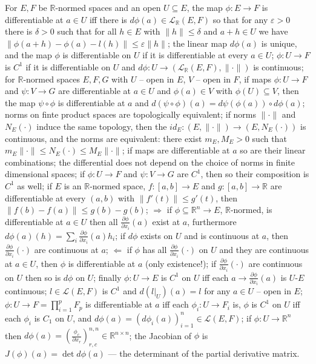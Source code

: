 \documentclass[a4paper]{article}
\newcommand{\Lcal}{\mathcal{L}}
\newcommand{\real}{\mathbb{R}}
\begin{document}
For $E, F$ be $\real$-normed spaces and an open $U\subseteq E$, the map $\phi\colon E\to F$
is differentiable at $a\in U$ iff there is $d\phi(a) \in \Lcal_\real(E, F)$ so that for any
$\varepsilon > 0$ there is $\delta > 0$ such that for all $h\in E$ with $\|h\| \leq \delta$
and $a + h \in U$ we have $\|\phi(a+h) - \phi(a) - l(h) \| \leq \varepsilon \|h\|$;
%
the linear map $d\phi(a)$ is unique, and the map $\phi$ is differentiable on $U$ if
it is differentiable at every $a\in U$;
%
$\phi\colon U \to F$ is $C^1$ if it is differentiable on $U$ and
$d\phi\colon U \to (\Lcal_\real(E, F), \|\cdot\|)$ is continuous;
%
for $\real$-normed spaces $E, F, G$ with $U$ -- open in $E$, $V$ -- open in $F$, if
maps $\phi\colon U\to F$ and $\psi\colon V\to G$ are differentiable at $a\in U$ and
$\phi(a)\in V$ with $\phi(U) \subseteq V$, then the map $\psi\circ \phi$ is differentiable
at $a$ and $d(\psi\circ\phi)(a) = d\psi(\phi(a)) \circ d\phi(a)$;
%
norms on finte product spaces are topologically equivalent;
%
if norms $\|\cdot\|$ and $N_E(\cdot)$ induce the same topology, then the
$id_E\colon (E, \|\cdot\|) \to (E, N_E(\cdot))$ is continuous, and the norms are equivalent:
there exist $m_E, M_E > 0$ such that $m_E\|\cdot\| \leq N_E(\cdot) \leq M_E \|\cdot\|$;
%
if maps are differentiable at $a$ so are their linear combinations;
%
the differential does not depend on the choice of norms in finite dimensional spaces;
%
if $\phi\colon U\to F$ and $\psi\colon V\to G$ are $C^1$, then so their composition is
$C^1$ as well;
%
if $E$ is an $\real$-normed space, $f\colon [a, b] \to E$ and $g\colon [a, b] \to \real$
are differentiable at every $(a, b)$ with $\|f'(t)\| \leq g'(t)$, then
$\|f(b) - f(a)\| \leq g(b) - g(b)$;
%
$\Rightarrow$ if $\phi\subseteq \real^n \to E$, $\real$-normed, is differentiable at
$a\in U$ then all $\tfrac{\partial \phi}{\partial x_i}(a)$ exist at $a$, furthermore
$d\phi(a)(h) = \sum_i \tfrac{\partial \phi}{\partial x_i}(a) h_i$;
%
if $d\phi$ exists on $U$ and is continuous at $a$, then
$\tfrac{\partial \phi}{\partial x_i}(\cdot)$ are continuous at $a$;
%
$\Leftarrow$ if $\phi$ has all $\tfrac{\partial \phi}{\partial x_i}(\cdot)$ on $U$ and
they are continuous at $a\in U$, then $\phi$ is differentiable at $a$ (only existence!);
%
if $\tfrac{\partial \phi}{\partial x_i}(\cdot)$ are continuous on $U$ then so is $d\phi$
on $U$;
%
finally $\phi\colon U\to E$ is $C^1$ on $U$ iff each
$a\to \tfrac{\partial \phi}{\partial x_i}(a)$ is $U$-$E$ continuous;
%
$l\in \Lcal(E, F)$ is $C^1$ and $d(l\big\vert_U)(a) = l$ for any $a\in U$ -- open in $E$;
%
$\phi\colon U \to F = \prod_{i=1}^p F_p$ is differentiable at $a$ iff each
$\phi_i\colon U\to F_i$ is, $\phi$ is $C^1$ on $U$ iff each $\phi_i$ is $C_1$ on $U$,
and $d\phi(a) = (d\phi_i(a))_{i=1}^n \in \Lcal(E, F)$;
%
if $\phi\colon U \to \real^n$ then
$d\phi(a) = (\tfrac{\phi_c}{\partial x_r})_{r,c}^{n,n} \in \real^{n\times n}$;
%
the Jacobian of $\phi$ is $J(\phi)(a) = \det d\phi(a)$ --- the determinant of the
partial derivative matrix.
\end{document}
